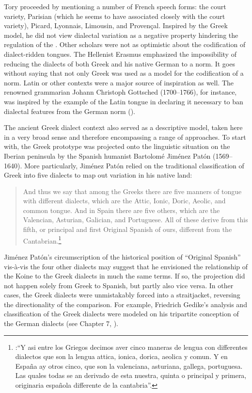 Tory proceeded by mentioning a number of French speech forms: the court variety, Parisian (which he seems to have associated closely with the court variety), Picard, Lyonnais, Limousin, and Provençal. Inspired by the Greek model, he did not view dialectal variation as a negative property hindering the regulation of the . Other scholars were not as optimistic about the codification of dialect-ridden tongues. The Hellenist Erasmus \citet[239]{Schmidt1615} emphasized the impossibility of reducing the dialects of both Greek and his native German to a norm. It goes without saying that not only Greek was used as a model for the codification of a norm. Latin or other  contexts were a major source of inspiration as well. The renowned grammarian Johann Christoph Gottsched (1700–1766), for instance, was inspired by the example of the Latin tongue in declaring it necessary to ban dialectal features from the German norm (\citeyear[334]{Gottsched1748}).

The ancient Greek dialect context also served as a descriptive model, taken here in a very broad sense and therefore encompassing a range of approaches. To start with, the Greek prototype was projected onto the linguistic situation on the Iberian peninsula by the Spanish humanist Bartolomé Jiménez Patón (1569–1640). More particularly, Jiménez Patón relied on the traditional classification of Greek into five dialects to map out variation in his native land:

\begin{quote}
And thus we say that among the Greeks there are five manners of tongue with different dialects, which are the Attic, Ionic, Doric, Aeolic, and common tongue. And in Spain there are five others, which are the Valencian, Asturian, Galician, and Portuguese. All of these derive from this fifth, or principal and first Original Spanish of ours, different from the Cantabrian.\footnote{\citet[10\textsc{\textsuperscript{r}}\textsc{–10}\textsc{\textsuperscript{v}}]{Jimenez1604}:“Y asi entre los Griegos decimos aver cinco maneras de lengua con differentes dialectos que son la lengua attica, ionica, dorica, aeolica y comun. Y en España ay otros cinco, que son la valenciana, asturiana, gallega, portuguesa. Las quales todas se an derivado de esta nuestra, quinta o principal y primera, originaria española differente de la cantabria”.}
\end{quote}

Jiménez Patón’s circumscription of the historical position of “Original Spanish” vis-à-vis the four other dialects may suggest that he envisioned the relationship of the Koine to the Greek dialects in much the same terms. If so, the projection did not happen solely from Greek to Spanish, but partly also vice versa. In other cases, the Greek dialects were unmistakably forced into a  straitjacket, reversing the directionality of the comparison. For example, Friedrich Gedike’s analysis and classification of the Greek dialects were modeled on his tripartite conception of the German dialects (see Chapter 7, ).

